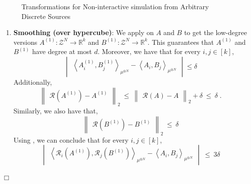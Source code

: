 \documentclass[11pt]{article}
\newcommand{\inangle}[1]{\left \langle #1 \right \rangle}
\newcommand{\inabs}[1]{\begin{vmatrix} #1 \end{vmatrix}}
\newcommand{\norm}[2]{\begin{Vmatrix} #2 \end{Vmatrix}_{#1}}
\newcommand{\sAND}{\ \mathrm{and} \ }
\newcommand{\wtilde}[1]{\widetilde{#1}}
\newcommand{\eps}{\varepsilon}
\newcommand{\bbR}{{\mathbb R}}
\newcommand{\calR}{\mathcal{R}}
\newcommand{\calZ}{\mathcal{Z}}
\newenvironment{proofof}[1]{\noindent {\em Proof of #1.} \hspace*{1mm}}{\hfill $\Box$}
\begin{document}
\begin{proofof}{\Cref{thm:non-int-sim}}
\begin{figure}
\begin{center}
\caption{Transformations for Non-interactive simulation from Arbitrary Discrete Sources}
\label{fig:General_NIS}
\end{center}
\end{figure}%

\begin{enumerate}
	\item {\bf Smoothing (over hypercube)}: We apply  on $A$ and $B$ to get the low-degree versions $A^{(1)} : \calZ^N \to \bbR^k$ and $B^{(1)} : \calZ^N \to \bbR^k$. This guarantees that $A^{(1)}$ and $B^{(1)}$ have degree at most $d$. Moreover, we have that for every $i, j \in [k]$,
	\[ \inabs{\inangle{A^{(1)}_i, B^{(1)}_j}_{\mu^{\otimes N}} - \inangle{A_i, B_j}_{\mu^{\otimes N}}} \le \delta \]
	Additionally,
	\[ \norm{2}{\calR(A^{(1)}) - A^{(1)}} ~\le~ \norm{2}{\calR(A) - A} + \delta ~\le~ \delta\;.\]
	Similarly, we also have that,
	\[\norm{2}{\calR(B^{(1)}) - B^{(1)}} ~\le~ \delta\]
	Using , we can conclude that for every $i, j \in [k]$,
	\begin{equation}
	\inabs{\inangle{\calR_i(A^{(1)}), \calR_j(B^{(1)})}_{\mu^{\otimes N}} - \inangle{A_i, B_j}_{\mu^{\otimes N}}} ~\le~ 3\delta \label{eqn:NIS-1}
	\end{equation}
	

\end{enumerate}
\end{proofof}
\end{document}
